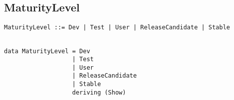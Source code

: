 \documentclass[11pt]{article}
\begin{document}
%
%
%
%

%	
%
%
%

\subsection{MaturityLevel}


\begin{lstlisting}[caption=BNF]			    
MaturityLevel ::= Dev | Test | User | ReleaseCandidate | Stable
\end{lstlisting}	

%
%
\begin{lstlisting}

data MaturityLevel = Dev
                   | Test
                   | User
                   | ReleaseCandidate
                   | Stable
                   deriving (Show)
\end{lstlisting}
\end{document}
